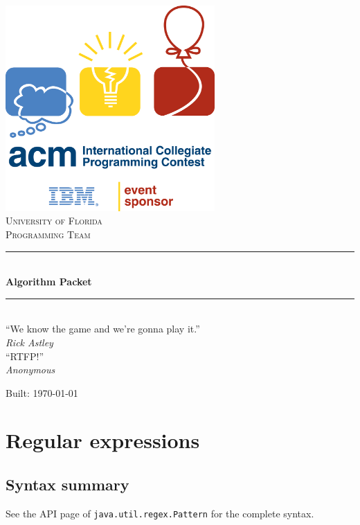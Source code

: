 \documentclass[a4paper,12pt]{article}
\begin{document}
\begin{titlepage}
\begin{center}
\includegraphics[width=0.6\textwidth]{icpc.png}\\[2cm]
\textsc{\LARGE University of Florida}\\[0.5cm]
\textsc{\Large Programming Team}\\[0.5cm]
 
\rule{\linewidth}{0.5mm}\\[0.4cm]
{\huge \bfseries Algorithm Packet}\\[0.2cm]
\rule{\linewidth}{0.5mm}\\[2cm]

``We know the game and we're gonna play it.''\\{\em Rick Astley}
\\[1cm]
``RTFP!''\\{\em Anonymous}

\vfill
{\large Built: \usdate\today \ \ampmtime}
\end{center}

\end{titlepage}

\tableofcontents

\newpage\section{Regular expressions}

\subsection{Syntax summary}

See the API page of \verb/java.util.regex.Pattern/ for the complete syntax.\\
\end{document}
